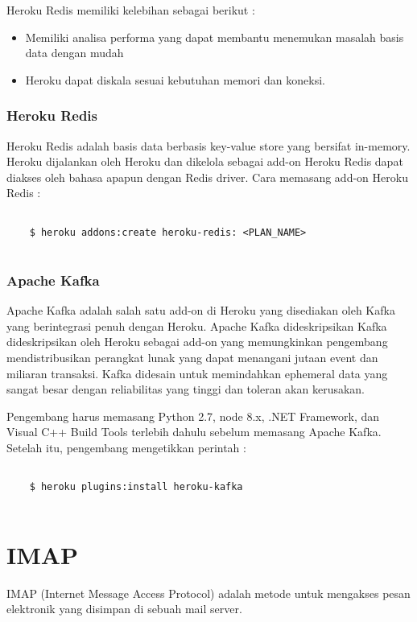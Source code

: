 Heroku Redis memiliki kelebihan sebagai berikut :
\begin{itemize}
\item Memiliki analisa performa yang dapat membantu menemukan masalah basis data dengan mudah
\item Heroku dapat diskala sesuai kebutuhan memori dan koneksi.
\end{itemize}



\subsubsection{Heroku Redis}
Heroku Redis adalah basis data berbasis key-value store yang bersifat in-memory. Heroku dijalankan oleh Heroku dan dikelola sebagai add-on Heroku Redis dapat diakses oleh bahasa apapun dengan Redis driver. Cara memasang add-on Heroku Redis :
\begin{lstlisting}
	
	$ heroku addons:create heroku-redis: <PLAN_NAME>
	
\end{lstlisting}

\subsubsection{Apache Kafka}
Apache Kafka adalah salah satu add-on di Heroku yang disediakan oleh Kafka yang berintegrasi penuh dengan Heroku. Apache Kafka dideskripsikan Kafka dideskripsikan oleh Heroku sebagai add-on yang memungkinkan pengembang mendistribusikan perangkat lunak yang dapat menangani jutaan event dan miliaran transaksi. Kafka didesain untuk memindahkan ephemeral data yang sangat besar dengan reliabilitas yang tinggi dan toleran akan kerusakan.

Pengembang harus memasang Python 2.7, node 8.x, .NET Framework, dan Visual C++ Build Tools terlebih dahulu sebelum memasang Apache Kafka. Setelah itu, pengembang mengetikkan perintah :
\begin{lstlisting}
	
	$ heroku plugins:install heroku-kafka
	
\end{lstlisting}

\section{IMAP}
\label{sec:IMAP}
IMAP (Internet Message Access Protocol) adalah metode untuk mengakses pesan elektronik yang disimpan di sebuah mail server.
